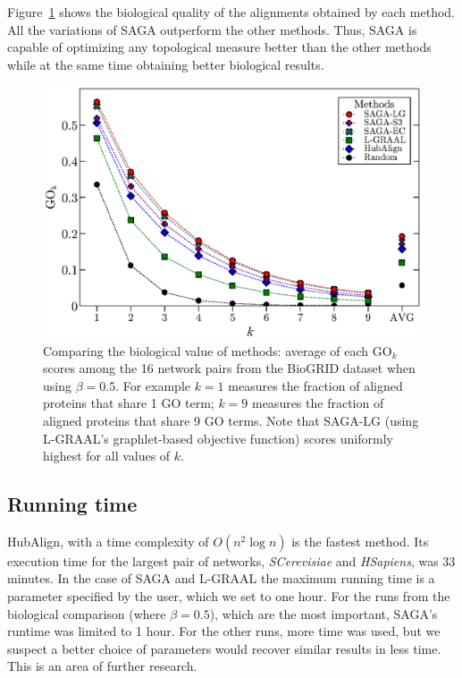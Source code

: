 \documentclass{bioinfo}
\begin{document}
Figure~\ref{fig:biogridgo} shows the biological quality of the alignments obtained by each method. All the variations of SAGA outperform the other methods. Thus, SAGA is capable of optimizing any topological measure better than the other methods while at the same time obtaining better biological results.

\begin{figure}
\centering
\includegraphics[width=0.99\linewidth]{biogridgo_bw.eps}
\caption{Comparing the biological value of methods: average of each $\mbox{GO}_k$ scores among the 16 network pairs from the BioGRID dataset when using $\beta=0.5$. For example $k=1$ measures the fraction of aligned proteins that share 1 GO term; $k=9$ measures the fraction of aligned proteins that share 9 GO terms. Note that SAGA-LG (using L-GRAAL's graphlet-based objective function) scores uniformly highest for all values of $k$.}
\label{fig:biogridgo}
\end{figure}

\subsection{Running time}

HubAlign, with a time complexity of $O(n^2\log n)$ is the fastest method. Its execution time for the largest pair of networks, \textit{SCerevisiae} and \textit{HSapiens}, was 33 minutes. In the case of SAGA and L-GRAAL the maximum running time is a parameter specified by the user, which we set to one hour. For the runs from the biological comparison (where $\beta=0.5$), which are the most important, SAGA's runtime was limited to 1 hour. For the other runs, more time was used, but we suspect a better choice of parameters would recover similar results in less time. This is an area of further research.
\end{document}
